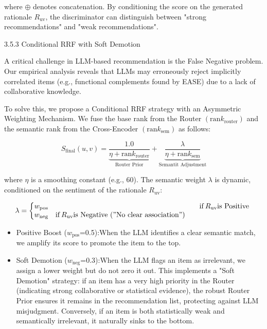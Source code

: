\documentclass[]{article}
\begin{document}
where \(\oplus\) denotes concatenation. By conditioning the score on the
generated rationale \(R_{\text{uv}}\), the discriminator can distinguish
between "strong recommendations" and "weak recommendations".

3.5.3 Conditional RRF with Soft Demotion

A critical challenge in LLM-based recommendation is the False Negative
problem. Our empirical analysis reveals that LLMs may erroneously reject
implicitly correlated items (e.g., functional complements found by EASE)
due to a lack of collaborative knowledge.

To solve this, we propose a Conditional RRF strategy with an Asymmetric
Weighting Mechanism. We fuse the base rank from the Router
\(\left( \text{ran}k_{\text{router}} \right)\) and the semantic rank
from the Cross-Encoder \(\left( \text{ran}k_{\text{sem}} \right)\) as
follows:

\[S_{\text{final}}\left( u,v \right) = \underset{\mathrm{\text{Router\ Prior}}}{\underbrace{\frac{1.0}{\eta + \text{ran}k_{\text{router}}}}} + \underset{\mathrm{\text{Semantit\ Adjustment}}}{\underbrace{\frac{\lambda}{\eta + \text{ran}k_{\text{sem}}}}}\]

where \(\eta\) is a smoothing constant (e.g., 60). The semantic weight
\(\lambda\) is dynamic, conditioned on the sentiment of the rationale
\(R_{\text{uv}}\):

\[\lambda = \left\{ \begin{matrix}
w_{\text{pos}} & & & \text{if\:}R_{\text{uv}}\mathrm{\text{is\ Positive}} \\
w_{\text{neg}} & \text{if\:}R_{\text{uv}}\mathrm{is\ Negative\ ("No\ clear\ association")} & & \\
\end{matrix} \right.\ \]

\begin{itemize}
\item
  Positive Boost (\(w_{\text{pos}}\)=0.5):When the LLM identifies a
  clear semantic match, we amplify its score to promote the item to the
  top.
\item
  Soft Demotion (\(w_{\text{neg}}\)=0.3):When the LLM flags an item as
  irrelevant, we assign a lower weight but do not zero it out. This
  implements a "Soft Demotion" strategy: if an item has a very high
  priority in the Router (indicating strong collaborative or statistical
  evidence), the robust Router Prior ensures it remains in the
  recommendation list, protecting against LLM misjudgment. Conversely,
  if an item is both statistically weak and semantically irrelevant, it
  naturally sinks to the bottom.
\end{itemize}
\end{document}
